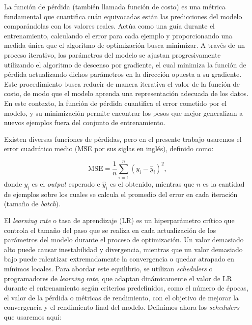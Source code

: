 La función de pérdida (también llamada función de costo) es una métrica fundamental que cuantifica cuán equivocadas están las predicciones del modelo comparándolas con los valores reales. Actúa como una guía durante el entrenamiento, calculando el error para cada ejemplo y proporcionando una medida única que el algoritmo de optimización busca minimizar. A través de un proceso iterativo, los parámetros del modelo se ajustan progresivamente utilizando el algoritmo de descenso por gradiente, el cual minimiza la función de pérdida actualizando dichos parámetros en la dirección opuesta a su gradiente. Este procedimiento busca reducir de manera iterativa el valor de la función de costo, de modo que el modelo aprenda una representación adecuada de los datos. En este contexto, la función de pérdida cuantifica el error cometido por el modelo, y su minimización permite encontrar los pesos que mejor generalizan a nuevos ejemplos fuera del conjunto de entrenamiento.

Existen diversas funciones de pérdidas, pero en el presente trabajo usaremos el error cuadrático medio (MSE por sus siglas en inglés), definido como:

\begin{equation}
\text{MSE} = \frac{1}{n} \sum_{i=1}^{n} (y_i - \hat{y}_i)^2,
\end{equation}
donde $y_i$ es el \emph{output} esperado e $\hat{y}_i$ es el obtenido, mientras que $n$ es la cantidad de ejemplos sobre los cuales se calcula el promedio del error en cada iteración (tamaño de \emph{batch}).


El \emph{learning rate} o tasa de aprendizaje (LR) es un hiperparámetro crítico que controla el tamaño del paso que se realiza en cada actualización de los parámetros del modelo durante el proceso de optimización. Un valor demasiado alto puede causar inestabilidad y divergencia, mientras que un valor demasiado bajo puede ralentizar extremadamente la convergencia o quedar atrapado en mínimos locales. Para abordar este equilibrio, se utilizan \emph{schedulers} o programadores de \emph{learning rate}, que adaptan dinámicamente el valor de LR durante el entrenamiento según criterios predefinidos, como el número de épocas, el valor de la pérdida o métricas de rendimiento, con el objetivo de mejorar la convergencia y el rendimiento final del modelo. Definimos ahora los \emph{schedulers} que usaremos aquí:

